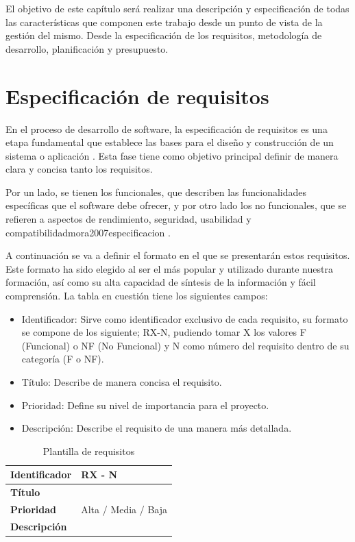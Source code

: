 El objetivo de este capítulo será realizar una descripción y especificación de todas las características que componen este trabajo desde un punto de vista de la gestión del mismo. Desde la especificación de los requisitos, metodología de desarrollo, planificación y presupuesto. 

\section {Especificación de requisitos}

En el proceso de desarrollo de software, la especificación de requisitos es una etapa fundamental que establece las bases para el diseño y construcción de un sistema o aplicación \cite{mora2007especificacion}. Esta fase tiene como objetivo principal definir de manera clara y concisa tanto los requisitos.

Por un lado, se tienen los funcionales, que describen las funcionalidades específicas que el software debe ofrecer, y por otro lado los no funcionales, que se refieren a aspectos de rendimiento, seguridad, usabilidad y compatibilidadmora2007especificacion \cite{mora2007especificacion}.

A continuación se va a definir el formato en el que se presentarán estos requisitos. Este formato ha sido elegido al ser el más popular y utilizado durante nuestra formación, así como su alta capacidad de síntesis de la información y fácil comprensión. La tabla en cuestión tiene los siguientes campos:

\begin{itemize}
    \item Identificador: Sirve como identificador exclusivo de cada requisito, su formato se compone de los siguiente; RX-N, pudiendo tomar X los valores F (Funcional) o NF (No Funcional) y N como número del requisito dentro de su categoría (F o NF).
    \item Título: Describe de manera concisa el requisito.
    \item Prioridad: Define su nivel de importancia para el proyecto.
    \item Descripción: Describe el requisito de una manera más detallada.
\end{itemize}


\begin{table}[H] 
\begin{center}
\begin{tabular} {|P{4cm}|P{10cm}|}\hline
   {\bf Identificador} &{\bf RX - N}\\ \hline
  \textbf{Título}& \\ \hline
  \textbf{Prioridad}& Alta / Media / Baja  \\ \hline
  \textbf{Descripción}& \\ \hline
\end{tabular}
\end{center}
\vspace{-0.6cm}
\caption{Plantilla de requisitos}
\end{table}



